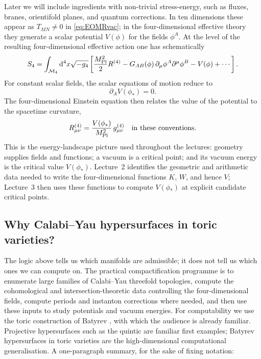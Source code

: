 Later we will include ingredients with non-trivial
stress-energy, such as fluxes, branes, orientifold planes, and
quantum corrections.  In ten dimensions these appear as
$T_{MN}\neq 0$ in \eqref{eq:EOMRvac}; in the four-dimensional
effective theory they generate a scalar potential $V(\phi)$ for the
fields $\phi^A$.
At the level of the resulting
four-dimensional effective action one has schematically
\begin{equation}
    S_4
    =
    \int_{\mathcal{M}_4}\mathrm{d}^4x\sqrt{-g_4}
    \left[
        \frac{M_{\mathrm{Pl}}^2}{2}R^{(4)}
        -G_{AB}(\phi)\,\partial_\mu\phi^A\partial^\mu\phi^B
        -V(\phi)
        +\cdots
    \right].
\end{equation}
For constant scalar fields, the scalar equations of motion reduce to
\begin{equation}
    \partial_A V(\phi_*)=0 .
\end{equation}
The four-dimensional Einstein equation then relates the value of the
potential to the spacetime curvature,
\begin{equation}
    R^{(4)}_{\mu\nu}
    =
    \frac{V(\phi_*)}{M_{\mathrm{Pl}}^2}\,g^{(4)}_{\mu\nu}
    \quad
    \text{in these conventions}.
\end{equation}
This is the energy-landscape picture used throughout the lectures:
geometry supplies fields and functions; a vacuum is a critical point;
and its vacuum energy is the critical value $V(\phi_*)$.
Lecture~2 identifies the geometric and arithmetic data
needed to write the four-dimensional functions $K$, $W$, and hence
$V$; Lecture~3 then uses these functions to compute $V(\phi_*)$ at
explicit candidate critical points.




\subsection{Why Calabi--Yau hypersurfaces in toric varieties?}\label{ssec:L1-toric}

The logic above tells us which manifolds
are admissible; it does not tell us which ones we can compute on.
The practical compactification programme is to enumerate large
families of Calabi--Yau threefold topologies, compute the
cohomological and intersection-theoretic data controlling the
four-dimensional fields, compute periods and instanton corrections
where needed, and then use these inputs to study potentials and
vacuum energies. For computability we use the toric construction of
Batyrev \cite{Batyrev:1993oya}, with which the audience is already
familiar. Projective hypersurfaces such as the quintic are familiar
first examples; Batyrev hypersurfaces in toric varieties are the
high-dimensional computational generalisation. A one-paragraph
summary, for the sake of fixing notation:

